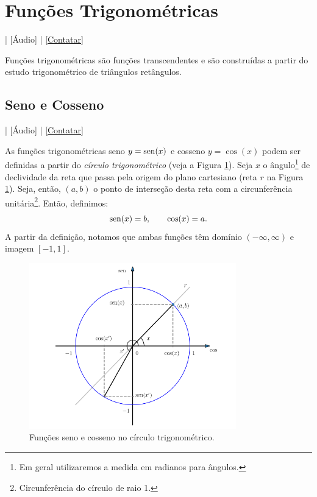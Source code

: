 \section{Funções Trigonométricas}\label{cap_funcao_sec_funtri}

\begin{flushright}
  [Vídeo] | [Áudio] | \href{https://phkonzen.github.io/notas/contato.html}{[Contatar]}
\end{flushright}

Funções trigonométricas são funções transcendentes e são construídas a partir do estudo trigonométrico de triângulos retângulos.

\subsection{Seno e Cosseno}

\begin{flushright}
  [Vídeo] | [Áudio] | \href{https://phkonzen.github.io/notas/contato.html}{[Contatar]}
\end{flushright}

As funções trigonométricas seno $y=\operatorname{sen}(x)$ e cosseno $y=\cos(x)$ podem ser definidas a partir do \emph{círculo trigonométrico} (veja a Figura \ref{fig:cos_seno}). Seja $x$ o ângulo\footnote{Em geral utilizaremos a medida em radianos para ângulos.} de declividade da reta que passa pela origem do plano cartesiano (reta $r$ na Figura \ref{fig:cos_seno}). Seja, então, $(a,b)$ o ponto de interseção desta reta com a circunferência unitária\footnote{Circunferência do círculo de raio 1.}. Então, definimos:
\begin{equation}
  \operatorname{sen}(x) = b,\qquad \cos(x) = a.
\end{equation}
A partir da definição, notamos que ambas funções têm domínio $(-\infty, \infty)$ e imagem $[-1, 1]$.

\begin{figure}[H]
  \centering
  \includegraphics[width=0.8\textwidth]{./cap_funcao/dados/fig_cos_seno/fig_cos_seno}
  \caption{Funções seno e cosseno no círculo trigonométrico.}
  \label{fig:cos_seno}
\end{figure}

